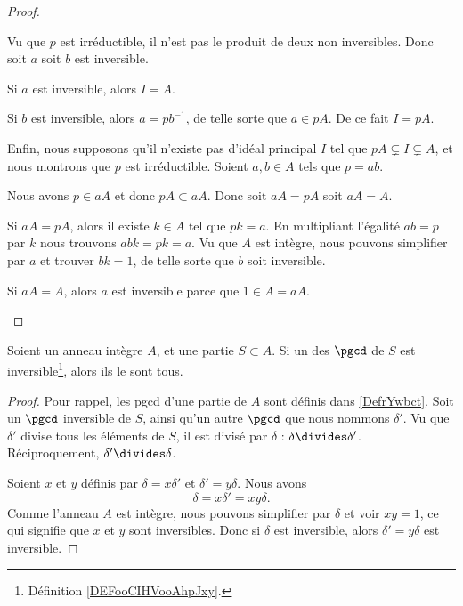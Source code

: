 \begin{proof}
\begin{subproof}
		Vu que \( p\) est irréductible, il n'est pas le produit de deux non inversibles. Donc soit \( a\) soit \( b\) est inversible.

		Si \( a\) est inversible, alors \( I=A\).

		Si \( b\) est inversible, alors \( a=pb^{-1}\), de telle sorte que \( a\in pA\). De ce fait \( I=pA\).

		\spitem[\ref{ITEMooGHGCooRkJilg}\( \Leftarrow\)]

		Enfin, nous supposons qu'il n'existe pas d'idéal principal \( I\) tel que \( pA\subsetneq I\subsetneq A\), et nous montrons que \( p\) est irréductible. Soient \( a,b\in A\) tels que \( p=ab\).

		Nous avons \( p\in aA\) et donc \( pA\subset aA\). Donc soit \( aA=pA\) soit \( aA=A \).

		Si \( aA=pA\), alors il existe \( k\in A\) tel que \( pk=a\). En multipliant l'égalité \( ab=p\) par \( k \) nous trouvons \( abk=pk=a\). Vu que \( A\) est intègre, nous pouvons simplifier par \( a\) et trouver \( bk=1\), de telle sorte que \( b\) soit inversible.


		Si \( aA=A\), alors \( a\) est inversible parce que \( 1\in A=aA\).
	\end{subproof}
\end{proof}

\begin{lemma}		\label{LEMooSFHMooQoKsPV}
	Soient un anneau intègre \( A\), et une partie \( S\subset A\). Si un des \( \pgcd\) de \( S\) est inversible\footnote{Définition \ref{DEFooCIHVooAhpJxy}.}, alors ils le sont tous.
\end{lemma}

\begin{proof}
	Pour rappel, les pgcd d'une partie de \(A\) sont définis dans \ref{DefrYwbct}. Soit un \( \pgcd\) inversible de \( S\), ainsi qu'un autre \( \pgcd\) que nous nommons \( \delta'\). Vu que \( \delta'\) divise tous les éléments de \( S\), il est divisé par \( \delta\) : \( \delta\divides\delta'\). Réciproquement, \( \delta'\divides \delta\).

	Soient \( x\) et \( y\) définis par \( \delta=x\delta'\) et \( \delta'=y\delta\). Nous avons
	\begin{equation}
		\delta=x\delta'=xy\delta.
	\end{equation}
	Comme l'anneau \( A\) est intègre, nous pouvons simplifier par \( \delta\) et voir \( xy=1\), ce qui signifie que \( x\) et \( y\) sont inversibles. Donc si \( \delta\) est inversible, alors \( \delta'=y\delta\) est inversible.
\end{proof}

